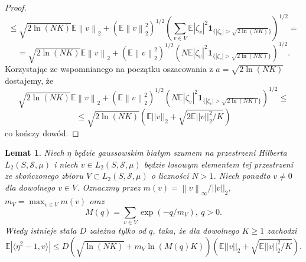 \documentclass{article}
\newtheorem*{lem}{Lemat}
\newcommand{\norm}[1]{\left\lVert#1\right\rVert}
\begin{document}
\begin{proof}
\begin{displaymath}
\end{displaymath}
\begin{displaymath}
\leq \sqrt{2\ln (NK)}\mathbb{E}\norm{v}_2+\left(\mathbb{E}\norm{v}_2^2\right)^{1/2}\left(\sum_{v\in V}\mathbb{E}|\zeta_v|^2\pmb{1}_{\{|\zeta_v|> \sqrt{2\ln (NK)}\}}\right)^{1/2}=
\end{displaymath}
\begin{displaymath}
=\sqrt{2\ln (NK)}\mathbb{E}\norm{v}_2+\left(\mathbb{E}\norm{v}_2^2\right)^{1/2}\left(N\mathbb{E}|\zeta_v|^2\pmb{1}_{\{|\zeta_v|> \sqrt{2\ln (NK)}\}}\right)^{1/2}.
\end{displaymath}
Korzystając ze wspomnianego na początku oszacowania z $a=\sqrt{2\ln (NK)}$ dostajemy, że
\begin{displaymath}
\sqrt{2\ln (NK)}\mathbb{E}\norm{v}_2+\left(\mathbb{E}\norm{v}_2^2\right)^{1/2}\left(N\mathbb{E}|\zeta_v|^2\pmb{1}_{\{|\zeta_v|> \sqrt{2\ln (NK)}\}}\right)^{1/2}\leq
\end{displaymath}
\begin{displaymath}
\leq \sqrt{2\ln (NK)}\left(\mathbb{E}||v||_2+\sqrt{2\mathbb{E}||v||_2^2/K}\right)
\end{displaymath}
co kończy dowód.
\end{proof}







\begin{lem}
Niech $\eta$ będzie gaussowskim białym szumem na przestrzeni Hilberta $L_2(S,\mathcal{S},\mu)$ i niech $v\in L_2(S,\mathcal{S},\mu)$ będzie losowym elementem tej przestrzeni ze skończonego zbioru $V\subset L_2(S,\mathcal{S},\mu)$ o liczności $N>1$. Niech ponadto $v\neq 0$ dla dowolnego $v\in V$. Oznaczmy przez $m(v)=\norm{v}_{\infty}/||v||_2$, $m_V=\max_{v\in V}m(v)$ oraz 
\begin{displaymath}
M(q)=\sum_{v\in V}\exp (-q/m_V),\ q>0.
\end{displaymath}
Wtedy istnieje stała $D$ zależna tylko od $q$, taka, że dla dowolnego $K\geq 1$ zachodzi
\begin{displaymath}
\mathbb{E}\left|\langle \eta^2-1, v\rangle\right|\leq D\left(\sqrt{\ln (NK)}+m_V\ln (M(q)K)\right)\left(\mathbb{E}||v||_2+\sqrt{\mathbb{E}||v||_2^2/K}\right).
\end{displaymath}
\end{lem}
\end{document}
